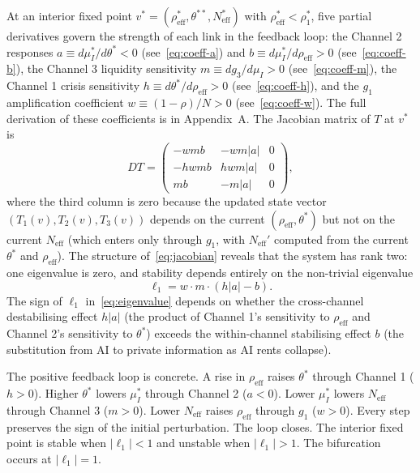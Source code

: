 At an interior fixed point $v^* = (\rho_{\text{eff}}^*, \theta^{**}, N_{\text{eff}}^*)$ with $\rho_{\text{eff}}^* < \rho_1^*$, five partial derivatives govern the strength of each link in the feedback loop: the Channel 2 responses $a \equiv d\mu_I^*/d\theta^* < 0$ (see~\eqref{eq:coeff-a}) and $b \equiv d\mu_I^*/d\rho_{\text{eff}} > 0$ (see~\eqref{eq:coeff-b}), the Channel 3 liquidity sensitivity $m \equiv dg_3/d\mu_I > 0$ (see~\eqref{eq:coeff-m}), the Channel 1 crisis sensitivity $h \equiv d\theta^*/d\rho_{\text{eff}} > 0$ (see~\eqref{eq:coeff-h}), and the $g_1$ amplification coefficient $w \equiv (1-\rho)/N > 0$ (see~\eqref{eq:coeff-w}). The full derivation of these coefficients is in Appendix~A. The Jacobian matrix of $T$ at $v^*$ is
\begin{equation}\label{eq:jacobian}
  DT = \begin{pmatrix} -wmb & -wm|a| & 0 \\ -hwmb & hwm|a| & 0 \\ mb & -m|a| & 0 \end{pmatrix},
\end{equation}
where the third column is zero because the updated state vector $(T_1(v), T_2(v), T_3(v))$ depends on the current $(\rho_{\text{eff}}, \theta^*)$ but not on the current $N_{\text{eff}}$ (which enters only through $g_1$, with $N_{\text{eff}}'$ computed from the current $\theta^*$ and $\rho_{\text{eff}}$). The structure of~\eqref{eq:jacobian} reveals that the system has rank two: one eigenvalue is zero, and stability depends entirely on the non-trivial eigenvalue
\begin{equation}\label{eq:eigenvalue}
  \ell_1 = w \cdot m \cdot (h|a| - b).
\end{equation}
The sign of $\ell_1$ in~\eqref{eq:eigenvalue} depends on whether the cross-channel destabilising effect $h|a|$ (the product of Channel 1's sensitivity to $\rho_{\text{eff}}$ and Channel 2's sensitivity to $\theta^*$) exceeds the within-channel stabilising effect $b$ (the substitution from AI to private information as AI rents collapse).

The positive feedback loop is concrete. A rise in $\rho_{\text{eff}}$ raises $\theta^*$ through Channel 1 ($h > 0$). Higher $\theta^*$ lowers $\mu_I^*$ through Channel 2 ($a < 0$). Lower $\mu_I^*$ lowers $N_{\text{eff}}$ through Channel 3 ($m > 0$). Lower $N_{\text{eff}}$ raises $\rho_{\text{eff}}$ through $g_1$ ($w > 0$). Every step preserves the sign of the initial perturbation. The loop closes. The interior fixed point is stable when $|\ell_1| < 1$ and unstable when $|\ell_1| > 1$. The bifurcation occurs at $|\ell_1| = 1$.

